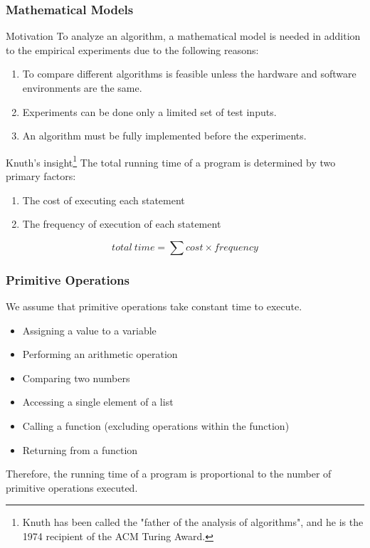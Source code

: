 \documentclass[aspectratio=169, 14pt]{beamer}
\begin{document}
\begin{frame}[fragile]
	\frametitle{Mathematical Models}
	\begin{block}{Motivation}
		To analyze an algorithm, a \alert{mathematical model} is needed in addition to the empirical experiments due to the following reasons:
	\end{block}
	\begin{enumerate}
		\item<1-> To compare different algorithms is feasible unless the hardware and software environments are the same.
		\item<2-> Experiments can be done only a limited set of test inputs.
		\item<3-> An algorithm must be fully implemented before the experiments.
	\end{enumerate}
\end{frame}

\begin{frame}

	\begin{exampleblock}{Knuth's insight\footnote{Knuth has been called the "father of the analysis of algorithms", and he is the 1974 recipient of the ACM Turing Award.}}
		The total running time of a program is determined by two primary factors:
		\begin{enumerate}
			\item The cost of executing each statement
			\item The frequency of execution of each statement
		\end{enumerate}
	\end{exampleblock}

	\[total\ time = \sum{cost \times frequency}\]

\end{frame}


\begin{frame}
	\frametitle{Primitive Operations}
	We assume that \alert{primitive operations} take \alert{constant} time to execute.

	\begin{itemize}
		\item Assigning a value to a variable
		\item Performing an arithmetic operation
		\item Comparing two numbers
		\item Accessing a single element of a list
		\item Calling a function (excluding operations within the function)
		\item Returning from a function
	\end{itemize}

	Therefore, \alert{the running time of a program is proportional to the number of primitive operations executed.}


\end{frame}
\end{document}
